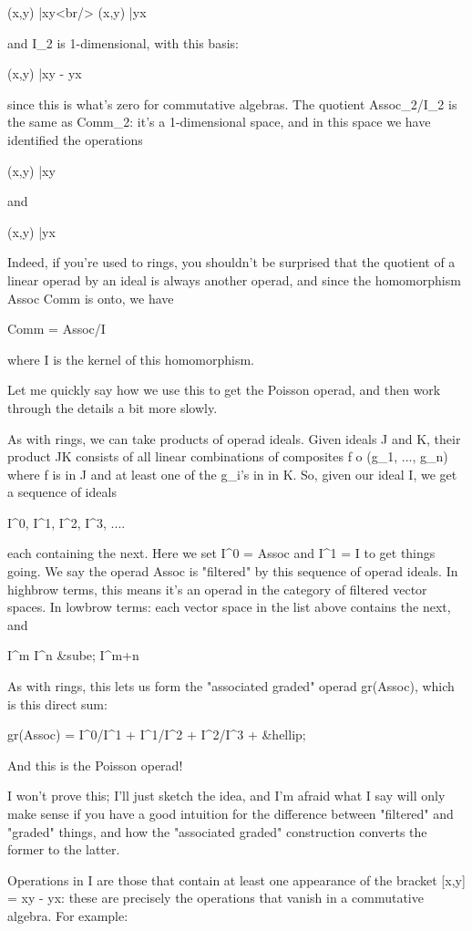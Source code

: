 (x,y) |\to  xy<br/>
(x,y) |\to  yx

and I_{2} is 1-dimensional, with this basis:

(x,y) |\to  xy - yx

since this is what's zero for commutative algebras.  The quotient
Assoc_{2}/I_{2} is the same as Comm_{2}: it's
a 1-dimensional space, and in this space we have identified the
operations

(x,y) |\to  xy

and 

(x,y) |\to  yx

Indeed, if you're used to rings, you shouldn't be surprised
that the quotient of a linear operad by an ideal is always another
operad, and since the homomorphism Assoc \to  Comm is onto, we have

Comm = Assoc/I 

where I is the kernel of this homomorphism.

Let me quickly say how we use this to get the Poisson operad, and then
work through the details a bit more slowly.

As with rings, we can take products of operad ideals.  Given ideals J
and K, their product JK consists of all linear combinations of
composites f o (g_{1}, ..., g_{n}) where f is in J and
at least one of the g_{i}'s in in K.  So, given our ideal I,
we get a sequence of ideals

I^{0}, I^{1}, I^{2}, I^{3}, ....

each containing the next.  Here we set I^{0} = Assoc and
I^{1} = I to get things going.  We say the operad Assoc is
"filtered" by this sequence of operad ideals.  In highbrow
terms, this means it's an operad in the category of filtered vector
spaces.  In lowbrow terms: each vector space in the list
above contains the next, and

I^{m} I^{n} &sube; I^{m+n}

As with rings, this lets us form the "associated graded"
operad gr(Assoc), which is this direct sum:

gr(Assoc) = I^{0}/I^{1} + I^{1}/I^{2} + I^{2}/I^{3} + &hellip;

And this is the Poisson operad!

I won't prove this; I'll just sketch the idea, and I'm afraid what I
say will only make sense if you have a good intuition for the
difference between "filtered" and "graded" things,
and how the "associated graded" construction converts the
former to the latter.

Operations in I are those that contain at least one appearance of the
bracket [x,y] = xy - yx: these are precisely the operations that
vanish in a commutative algebra.  For example:

